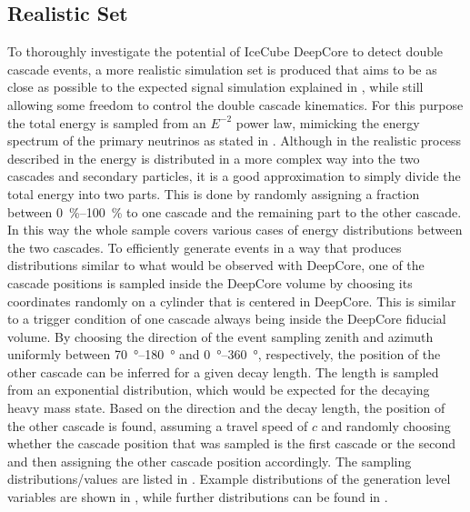 \subsection{Realistic Set}

To thoroughly investigate the potential of IceCube DeepCore to detect double cascade events, a more realistic simulation set is produced that aims to be as close as possible to the expected signal simulation explained in , while still allowing some freedom to control the double cascade kinematics. For this purpose the total energy is sampled from an $E^{-2}$ power law, mimicking the energy spectrum of the primary neutrinos as stated in . Although in the realistic process described in  the energy is distributed in a more complex way into the two cascades and secondary particles, it is a good approximation to simply divide the total energy into two parts. This is done by randomly assigning a fraction between \SIrange[range-phrase={~and~}]{0}{100}{\percent} to one cascade and the remaining part to the other cascade. In this way the whole sample covers various cases of energy distributions between the two cascades. To efficiently generate events in a way that produces distributions similar to what would be observed with DeepCore, one of the cascade positions is sampled inside the DeepCore volume by choosing its coordinates randomly on a cylinder that is centered in DeepCore. This is similar to a trigger condition of one cascade always being inside the DeepCore fiducial volume. By choosing the direction of the event sampling zenith and azimuth uniformly between \SIrange[range-phrase={~and~}]{70}{180}{\degree} and \SIrange[range-phrase={~and~}]{0}{360}{\degree}, respectively, the position of the other cascade can be inferred for a given decay length. The length is sampled from an exponential distribution, which would be expected for the decaying heavy mass state. Based on the direction and the decay length, the position of the other cascade is found, assuming a travel speed of $c$ and randomly choosing whether the cascade position that was sampled is the first cascade or the second and then assigning the other cascade position accordingly. The sampling distributions/values are listed in . Example distributions of the generation level variables are shown in , while further distributions can be found in .

